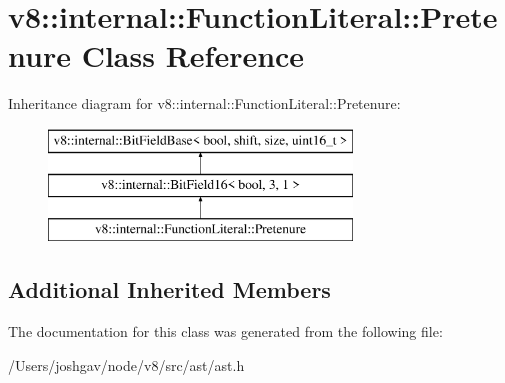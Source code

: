 \hypertarget{classv8_1_1internal_1_1_function_literal_1_1_pretenure}{}\section{v8\+:\+:internal\+:\+:Function\+Literal\+:\+:Pretenure Class Reference}
\label{classv8_1_1internal_1_1_function_literal_1_1_pretenure}
Inheritance diagram for v8\+:\+:internal\+:\+:Function\+Literal\+:\+:Pretenure\+:\begin{figure}[H]
\begin{center}
\leavevmode
\includegraphics[height=3.000000cm]{classv8_1_1internal_1_1_function_literal_1_1_pretenure}
\end{center}
\end{figure}
\subsection*{Additional Inherited Members}


The documentation for this class was generated from the following file\+:\begin{DoxyCompactItemize}
\item 
/\+Users/joshgav/node/v8/src/ast/ast.\+h\end{DoxyCompactItemize}

